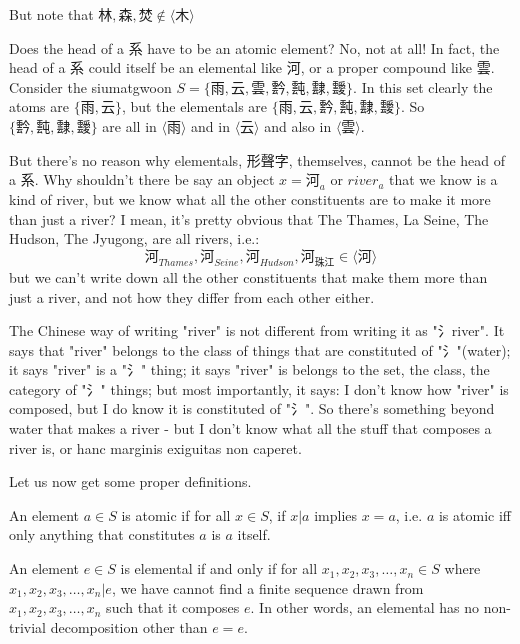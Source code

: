 But note that $\text{林}, \text{森},  \text{焚} \not\in \langle \text{木} \rangle$


Does the head of a 系 have to be an atomic element? No, not at all! In fact, the head of a 系 could itself be an elemental like 河, or a proper compound like 雲. Consider the siumatgwoon $S = \{\text{雨}, \text{云}, \text{雲}, \text{霒}, \text{霕}, \text{霴}, \text{靉}\}$. In this set clearly the atoms are $\{\text{雨}, \text{云}\}$, but the elementals are $\{\text{雨}, \text{云}, \text{霒}, \text{霕}, \text{霴}, \text{靉}\}$. So $\{\text{霒}, \text{霕}, \text{霴}, \text{靉}\}$ are all in $\langle \text{雨} \rangle$ and in $\langle \text{云} \rangle$ and also in $\langle \text{雲} \rangle$.

But there's no reason why elementals, 形聲字, themselves, cannot be the head of a 系. Why shouldn't there be say an object $x=\text{河}_{a}$ or $river_{a}$ that we know is a kind of river, but we know what all the other constituents are to make it more than just a river? I mean, it's pretty obvious that The Thames, La Seine, The Hudson, The Jyugong, are all rivers, i.e.: 
$$\text{河}_{Thames},\text{河}_{Seine},\text{河}_{Hudson},\text{河}_{\text{珠江}} \in \langle \text{河} \rangle$$
but we can't write down all the other constituents that make them more than just a river, and not how they differ from each other either.

The Chinese way of writing "river" is not different from writing it as "氵river". It says that "river" belongs to the class of things that are constituted of "氵"(water); it says "river" is a "氵" thing; it says "river" is belongs to the set, the class, the category of "氵" things; but most importantly, it says: I don't know how "river" is composed, but I do know it is constituted of "氵". So there's something beyond water that makes a river - but I don't know what all the stuff that composes a river is, or hanc marginis exiguitas non caperet.

Let us now get some proper definitions.


\begin{definition}[Atomics]\label{def:atomics}
    An element $a \in S$ is atomic if for all $x\in S$, if $x|a$ implies $x=a$, i.e. $a$ is atomic iff only anything that constitutes $a$ is $a$ itself.
\end{definition}

\begin{definition}[Elementals]\label{def:elementals}
    An element $e \in S$ is elemental if and only if for all $x_1, x_2, x_3, \ldots, x_n \in S$ where $x_1, x_2, x_3, \ldots, x_n | e$, we have cannot find a finite sequence drawn from $x_1, x_2, x_3,\ldots, x_n $ such that it composes $e$. In other words, an elemental has no non-trivial decomposition other than $e = e$. 
\end{definition}


